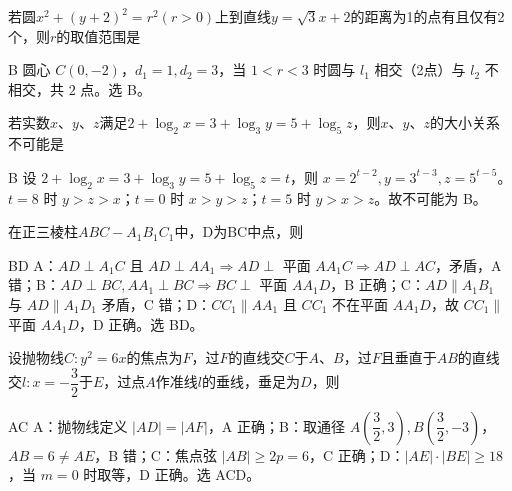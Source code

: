 \documentclass[12pt,a4paper]{article}%
\begin{document}
\begin{question}
若圆$x^2+(y+2)^2=r^2(r>0)$上到直线$y=\sqrt{3}x+2$的距离为1的点有且仅有2个，则$r$的取值范围是\choiceBox



\end{question}
\begin{answer}{B}
圆心 $C(0,-2)$，$d_1=1,d_2=3$，当 $1<r<3$ 时圆与 $l_1$ 相交（2点）与 $l_2$ 不相交，共 $2$ 点。选 B。
\end{answer}

\begin{question}
若实数$x$、$y$、$z$满足$2+\log_2x=3+\log_3y=5+\log_5z$，则$x$、$y$、$z$的大小关系不可能是\choiceBox



\end{question}
\begin{answer}{B}
设 $2+\log_2x=3+\log_3y=5+\log_5z=t$，则 $x=2^{t-2},y=3^{t-3},z=5^{t-5}$。$t=8$ 时 $y>z>x$；$t=0$ 时 $x>y>z$；$t=5$ 时 $y>x>z$。故不可能为 B。
\end{answer}



\begin{question}
在正三棱柱$ABC-A_1B_1C_1$中，D为BC中点，则\choiceBox



\end{question}
\begin{answer}{BD}
A：$AD\perp A_1C$ 且 $AD\perp AA_1\Rightarrow AD\perp$ 平面 $AA_1C\Rightarrow AD\perp AC$，矛盾，A 错；B：$AD\perp BC,AA_1\perp BC\Rightarrow BC\perp$ 平面 $AA_1D$，B 正确；C：$AD\parallel A_1B_1$ 与 $AD\parallel A_1D_1$ 矛盾，C 错；D：$CC_1\parallel AA_1$ 且 $CC_1$ 不在平面 $AA_1D$，故 $CC_1\parallel$ 平面 $AA_1D$，D 正确。选 BD。
\end{answer}

\begin{question}
设抛物线$C:y^2=6x$的焦点为$F$，过$F$的直线交$C$于$A$、$B$，过$F$且垂直于$AB$的直线交$l:x=-\dfrac{3}{2}$于$E$，过点$A$作准线$l$的垂线，垂足为$D$，则\choiceBox



\end{question}
\begin{answer}{AC}
A：抛物线定义 $|AD|=|AF|$，A 正确；B：取通径 $A(\dfrac32,3),B(\dfrac32,-3)$，$AB=6\neq AE$，B 错；C：焦点弦 $|AB|\ge2p=6$，C 正确；D：$|AE|\cdot|BE|\ge18$，当 $m=0$ 时取等，D 正确。选 ACD。
\end{answer}
\end{document}

